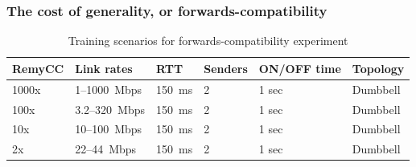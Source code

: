 \begin{frame}
\frametitle{The cost of generality, or forwards-compatibility}
\begin{table}
\begin{small}
\begin{tabular}{l|l|l|l|l|l|}
\bf RemyCC & \bf Link rates & \bf RTT & \bf Senders & ON/OFF time & Topology \\
\hline
1000x  & 1--1000~Mbps & 150~ms & 2  & 1 sec & Dumbbell\\
100x   & 3.2--320~Mbps & 150~ms & 2 & 1 sec & Dumbbell\\
10x    & 10--100~Mbps & 150~ms & 2 & 1 sec & Dumbbell \\
2x     & 22--44~Mbps & 150~ms & 2 & 1 sec & Dumbbell \\
\end{tabular}
\end{small}
\caption{Training scenarios for forwards-compatibility experiment}
\label{table:oprange}
\end{table}
\end{frame}

